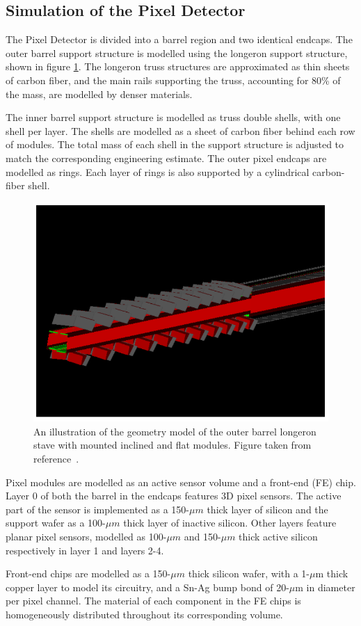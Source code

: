 \subsection{Simulation of the Pixel Detector }

The Pixel Detector is divided into a barrel region and two identical endcaps. The outer barrel support structure is modelled using the longeron support structure, shown in figure \ref{fig:itk-longeron}. The longeron truss structures are approximated as thin sheets of carbon fiber, and the main rails supporting the truss, accounting for 80\% of the mass, are modelled by denser materials. 

The inner barrel support structure is modelled as truss double shells, with one shell per layer. The shells are modelled as a sheet of carbon fiber behind each row of modules. The total mass of each shell in the support structure is adjusted to match the corresponding engineering estimate. The outer pixel endcaps are modelled as rings. Each layer of rings is also supported by a cylindrical carbon-fiber shell.

\begin{figure}[h!]
    \centering
    \includegraphics[width=0.5\linewidth]{figures/itk-longeron.png}
    \caption{An illustration of the \GEANT geometry model of the outer barrel longeron stave with mounted inclined and flat modules. Figure taken from reference~\cite{ATLAS-TDR-30}.}
    \label{fig:itk-longeron}
\end{figure}

Pixel modules are modelled as an active sensor volume and a front-end (FE) chip. Layer 0 of both the barrel in the endcaps features 3D pixel sensors. The active part of the sensor is implemented as a 150-$\mu m$ thick layer of silicon and the support wafer as a 100-$\mu m$ thick layer of inactive silicon. Other layers feature planar pixel sensors, modelled as 100-$\mu m$ and 150-$\mu m$ thick active silicon respectively in layer 1 and layers 2-4. 

Front-end chips are modelled as a 150-$\mu m$ thick silicon wafer, with a 1-$\mu$m thick copper layer to model its circuitry, and a Sn-Ag bump bond of 20-$\mu$m in diameter per pixel channel. The material of each component in the FE chips is homogeneously distributed throughout its corresponding volume.

